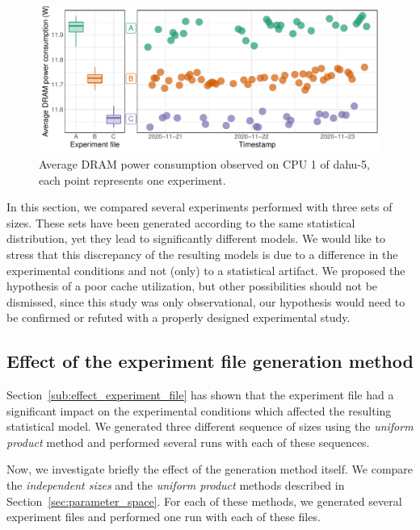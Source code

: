             \begin{figure}[htpb]
                \centering
                \includegraphics[width=\linewidth]{img/experiment/randomizing_sizes/expfile/average_power.pdf}
                \caption{Average DRAM power consumption observed on CPU 1 of dahu-5, each point represents one
                experiment.}%
                \label{fig:randomizing_sizes:expfile:average_power}
            \end{figure}

            In this section, we compared several \dgemm experiments performed with three sets of sizes. These sets have
            been generated according to the same statistical distribution, yet they lead to significantly different
            \dgemm models. We would like to stress that this discrepancy of the resulting models is due to a difference
            in the experimental conditions and not (only) to a statistical artifact. We proposed the hypothesis of a
            poor cache utilization, but other possibilities should not be dismissed, since this study was only
            observational, our hypothesis would need to be confirmed or refuted with a properly designed experimental
            study.

        \subsection{Effect of the experiment file generation method}%
        \label{sub:effect_experiment_file_generation_method}

            Section~\ref{sub:effect_experiment_file} has shown that the experiment file had a significant impact on the
            experimental conditions which affected the resulting statistical model. We generated three different
            sequence of sizes using the \emph{uniform product} method and performed several runs with each of these
            sequences.

            Now, we investigate briefly the effect of the generation method itself. We compare the \emph{independent
            sizes} and the \emph{uniform product} methods described in Section~\ref{sec:parameter_space}. For each of
            these methods, we generated several experiment files and performed one run with each of these files.

